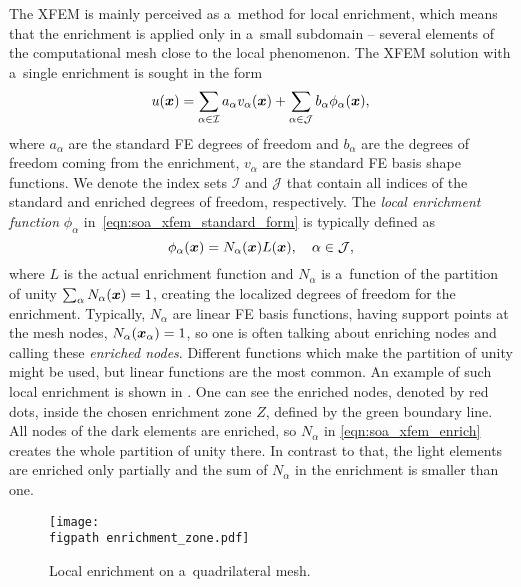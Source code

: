 The XFEM is mainly perceived as a~method for local enrichment, which means that the enrichment is applied only
in a~small subdomain -- several elements of the computational mesh close to the local phenomenon.
The XFEM solution with a~single enrichment is sought in the form
\begin{equation} \label{eqn:soa_xfem_standard_form}
  u(\mathbf{\boldsymbol{x}}) = \sum_{\alpha\in\mathcal{I}}a_\alpha v_\alpha(\mathbf{\boldsymbol{x}})
    + \sum_{\alpha\in\mathcal{J}} b_{\alpha} \phi_{\alpha}(\mathbf{\boldsymbol{x}}),
\end{equation}
where $a_\alpha$ are the standard FE degrees of freedom and $b_{\alpha}$ are the degrees of freedom coming from
the enrichment, $v_\alpha$ are the standard FE basis shape functions. We denote the index sets $\mathcal{I}$ and
$\mathcal{J}$ that contain all indices of the standard and enriched degrees of freedom, respectively.
The \emph{local enrichment function} $\phi_{\alpha}$ in~\eqref{eqn:soa_xfem_standard_form} is typically defined as
\begin{equation} \label{eqn:soa_xfem_enrich}
    \phi_{\alpha}(\mathbf{\boldsymbol{x}}) = N_\alpha(\mathbf{\boldsymbol{x}})L(\mathbf{\boldsymbol{x}}), \quad \alpha\in\mathcal{J},
\end{equation}
where $L$ is the actual enrichment function and $N_\alpha$ is a~function of the partition of unity
$\sum_\alpha N_\alpha(\mathbf{\boldsymbol{x}}) = 1$, creating the localized degrees of freedom for the enrichment.
Typically, $N_\alpha$ are linear FE basis functions, having support points at the mesh nodes, $N_\alpha(\mathbf{\boldsymbol{x}}_\alpha)=1$,
so one is often talking about enriching nodes and calling these \emph{enriched nodes}.
Different functions which make the partition of unity might be used, but linear functions are the most common.
An example of such local enrichment is shown in . One can see the enriched nodes, denoted
by red dots, inside the chosen enrichment zone $Z$, defined by the green boundary line. All nodes of the dark elements
are enriched, so $N_\alpha$ in \eqref{eqn:soa_xfem_enrich} creates the whole partition of unity there. In contrast to that, 
the light elements are enriched only partially and the sum of $N_\alpha$ in the enrichment is smaller than one.

\begin{figure}[!htb]
  \centering    
    \texttt{[image: \\figpath enrichment\_zone.pdf]}
  \caption[Local enrichment]{Local enrichment on a~quadrilateral mesh. }
  \label{fig:enrichment_zone}
\end{figure}
%     

